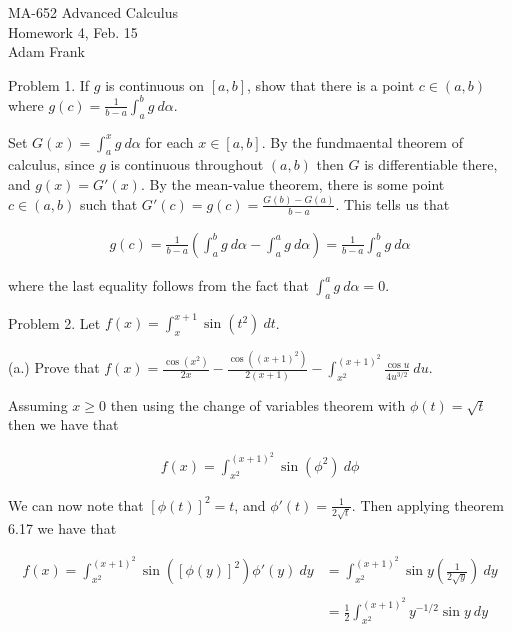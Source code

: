 \documentclass{article}
\begin{document}
  \begin{center} \Large
    MA-652 Advanced Calculus\\
    Homework 4, Feb. 15 \\
    Adam Frank
  \end{center}

  \vspace{1cm}

  {\Large \color{Sepia} Problem 1. If $g$ is continuous on $[a,b]$, show that there is a point $c\in (a,b)$ where $g(c)=\frac{1}{b-a}\int_a^b g\ d\alpha$.}

  \vspace{1cm}

  Set $G(x)=\int_a^x g \ d\alpha$ for each $x\in[a,b]$.  By the fundmaental theorem of calculus, since $g$ is continuous throughout $(a,b)$ then $G$ is differentiable there, and $g(x)=G'(x)$.  By the mean-value theorem, there is some point $c\in(a,b)$ such that $G'(c)=g(c)=\frac{G(b)-G(a)}{b-a}$.  This tells us that

  \begin{align*}
    g(c)=\frac{1}{b-a}\left(\int_a^b g \ d\alpha - \int_a^a g \ d\alpha\right)=\frac{1}{b-a}\int_a^b g \ d\alpha
  \end{align*}

  where the last equality follows from the fact that $\int_a^a g \ d\alpha = 0$.

  \pagebreak

  {\Large \color{Sepia} Problem 2. Let $f(x)=\int_x^{x+1} \sin(t^2)\ dt$.

  (a.) Prove that $f(x)=\frac{\cos(x^2)}{2x}-\frac{\cos((x+1)^2)}{2(x+1)}-\int_{x^2}^{(x+1)^2}\frac{\cos u}{4u^{3/2}}\ du$.

  }

  \vspace{1cm}

  Assuming $x\geq 0$ then using the change of variables theorem with $\phi(t)=\sqrt t$ then we have that 

  \begin{align*}
    f(x) = \int_{x^2}^{(x+1)^2} \sin (\phi^2) \  d\phi 
  \end{align*}

  We can now note that $[\phi(t)]^2 = t$, and $\phi'(t) = \frac{1}{2\sqrt t}$.  Then applying theorem 6.17 we have that 

  \begin{align*}
    f(x) = \int_{x^2}^{(x+1)^2}\sin ([\phi(y)]^2)\phi'(y) \ dy &= \int_{x^2}^{(x+1)^2} \sin y \left(\frac 1 {2\sqrt y}\right) \ dy \\\\
    &= \frac 1 2 \int_{x^2}^{(x+1)^2} y^{-1/2}\sin y \ dy 
  \end{align*}
\end{document}
